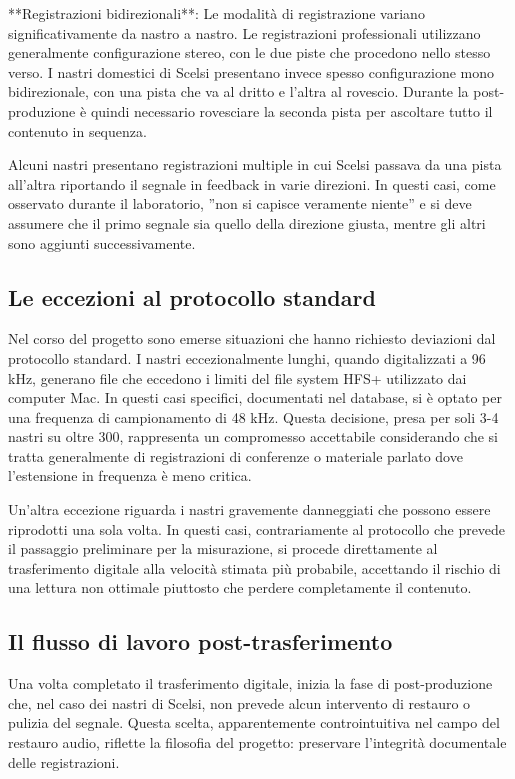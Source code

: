 **Registrazioni bidirezionali**: Le modalità di registrazione variano significativamente da nastro a nastro. Le registrazioni professionali utilizzano generalmente configurazione stereo, con le due piste che procedono nello stesso verso. I nastri domestici di Scelsi presentano invece spesso configurazione mono bidirezionale, con una pista che va al dritto e l'altra al rovescio. Durante la post-produzione è quindi necessario rovesciare la seconda pista per ascoltare tutto il contenuto in sequenza.

Alcuni nastri presentano registrazioni multiple in cui Scelsi passava da una pista all'altra riportando il segnale in feedback in varie direzioni. In questi casi, come osservato durante il laboratorio, ''non si capisce veramente niente'' e si deve assumere che il primo segnale sia quello della direzione giusta, mentre gli altri sono aggiunti successivamente.
\subsection{Le eccezioni al protocollo standard}
Nel corso del progetto sono emerse situazioni che hanno richiesto deviazioni dal protocollo standard. I nastri eccezionalmente lunghi, quando digitalizzati a 96 kHz, generano file che eccedono i limiti del file system HFS+ utilizzato dai computer Mac. In questi casi specifici, documentati nel database, si è optato per una frequenza di campionamento di 48 kHz. Questa decisione, presa per soli 3-4 nastri su oltre 300, rappresenta un compromesso accettabile considerando che si tratta generalmente di registrazioni di conferenze o materiale parlato dove l'estensione in frequenza è meno critica.

Un'altra eccezione riguarda i nastri gravemente danneggiati che possono essere riprodotti una sola volta. In questi casi, contrariamente al protocollo che prevede il passaggio preliminare per la misurazione, si procede direttamente al trasferimento digitale alla velocità stimata più probabile, accettando il rischio di una lettura non ottimale piuttosto che perdere completamente il contenuto.
\subsection{Il flusso di lavoro post-trasferimento}
Una volta completato il trasferimento digitale, inizia la fase di post-produzione che, nel caso dei nastri di Scelsi, non prevede alcun intervento di restauro o pulizia del segnale. Questa scelta, apparentemente controintuitiva nel campo del restauro audio, riflette la filosofia del progetto: preservare l'integrità documentale delle registrazioni\cite[p. 188]{Bernardini2012themul}.

